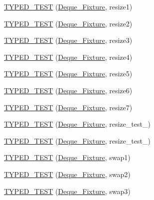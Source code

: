\begin{DoxyCompactItemize}
\item 
\hyperlink{TestDeque_8c_09_09_a4861cc7f4f1f2d8f90680487f8e4b6f4}{T\-Y\-P\-E\-D\-\_\-\-T\-E\-S\-T} (\hyperlink{structDeque__Fixture}{Deque\-\_\-\-Fixture}, resize1)
\item 
\hyperlink{TestDeque_8c_09_09_a4d1fd20f778de0be625788465b7ecbd3}{T\-Y\-P\-E\-D\-\_\-\-T\-E\-S\-T} (\hyperlink{structDeque__Fixture}{Deque\-\_\-\-Fixture}, resize2)
\item 
\hyperlink{TestDeque_8c_09_09_a43548d16dcb856e44d30ad9ebcefaa4f}{T\-Y\-P\-E\-D\-\_\-\-T\-E\-S\-T} (\hyperlink{structDeque__Fixture}{Deque\-\_\-\-Fixture}, resize3)
\item 
\hyperlink{TestDeque_8c_09_09_acef2b2b2ad033d418caca9d07a45c1ad}{T\-Y\-P\-E\-D\-\_\-\-T\-E\-S\-T} (\hyperlink{structDeque__Fixture}{Deque\-\_\-\-Fixture}, resize4)
\item 
\hyperlink{TestDeque_8c_09_09_a7db3e26540c8318a0c8e063def7848e7}{T\-Y\-P\-E\-D\-\_\-\-T\-E\-S\-T} (\hyperlink{structDeque__Fixture}{Deque\-\_\-\-Fixture}, resize5)
\item 
\hyperlink{TestDeque_8c_09_09_a636409bc2080e5b006d757a2e4959a3e}{T\-Y\-P\-E\-D\-\_\-\-T\-E\-S\-T} (\hyperlink{structDeque__Fixture}{Deque\-\_\-\-Fixture}, resize6)
\item 
\hyperlink{TestDeque_8c_09_09_a8d5db6b5c4cc307d99cb322c41bf3642}{T\-Y\-P\-E\-D\-\_\-\-T\-E\-S\-T} (\hyperlink{structDeque__Fixture}{Deque\-\_\-\-Fixture}, resize7)
\item 
\hyperlink{TestDeque_8c_09_09_a49393b148b2133863b6fd116f00868e7}{T\-Y\-P\-E\-D\-\_\-\-T\-E\-S\-T} (\hyperlink{structDeque__Fixture}{Deque\-\_\-\-Fixture}, resize\-\_\-test\-\_)
\item 
\hyperlink{TestDeque_8c_09_09_a75192a56be259b8bfb3b690f41015ac7}{T\-Y\-P\-E\-D\-\_\-\-T\-E\-S\-T} (\hyperlink{structDeque__Fixture}{Deque\-\_\-\-Fixture}, resize\-\_\-test\-\_)
\item 
\hyperlink{TestDeque_8c_09_09_a215253ea5c0cb1afcad6943cf7788c3e}{T\-Y\-P\-E\-D\-\_\-\-T\-E\-S\-T} (\hyperlink{structDeque__Fixture}{Deque\-\_\-\-Fixture}, swap1)
\item 
\hyperlink{TestDeque_8c_09_09_a899eb9ffe534295b28b0c274572def9e}{T\-Y\-P\-E\-D\-\_\-\-T\-E\-S\-T} (\hyperlink{structDeque__Fixture}{Deque\-\_\-\-Fixture}, swap2)
\item 
\hyperlink{TestDeque_8c_09_09_a7c7c3c95a8e8dede9f3e3e4e5edb8cc5}{T\-Y\-P\-E\-D\-\_\-\-T\-E\-S\-T} (\hyperlink{structDeque__Fixture}{Deque\-\_\-\-Fixture}, swap3)
\end{DoxyCompactItemize}


